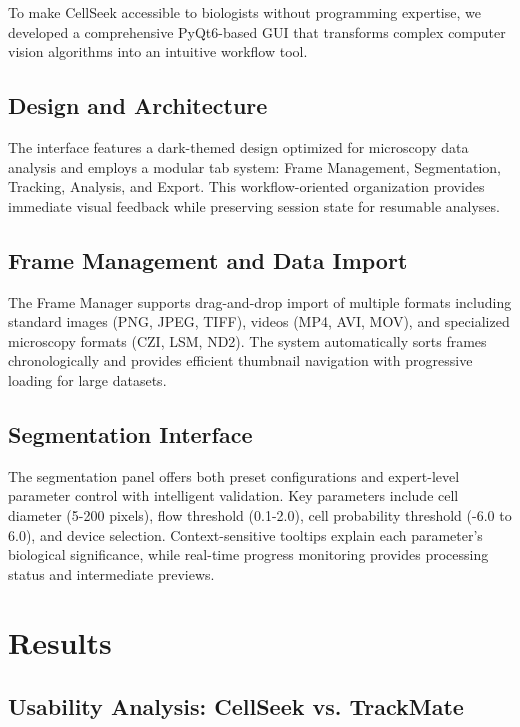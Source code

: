 \documentclass[12pt]{article}
\begin{document}
To make CellSeek accessible to biologists without programming expertise, we developed a comprehensive PyQt6-based GUI that transforms complex computer vision algorithms into an intuitive workflow tool.

\subsection{Design and Architecture}

The interface features a dark-themed design optimized for microscopy data analysis and employs a modular tab system: Frame Management, Segmentation, Tracking, Analysis, and Export. This workflow-oriented organization provides immediate visual feedback while preserving session state for resumable analyses.

\subsection{Frame Management and Data Import}

The Frame Manager supports drag-and-drop import of multiple formats including standard images (PNG, JPEG, TIFF), videos (MP4, AVI, MOV), and specialized microscopy formats (CZI, LSM, ND2). The system automatically sorts frames chronologically and provides efficient thumbnail navigation with progressive loading for large datasets.

\subsection{Segmentation Interface}

The segmentation panel offers both preset configurations and expert-level parameter control with intelligent validation. Key parameters include cell diameter (5-200 pixels), flow threshold (0.1-2.0), cell probability threshold (-6.0 to 6.0), and device selection. Context-sensitive tooltips explain each parameter's biological significance, while real-time progress monitoring provides processing status and intermediate previews.

\section{Results}

\subsection{Usability Analysis: CellSeek vs. TrackMate}
\end{document}
